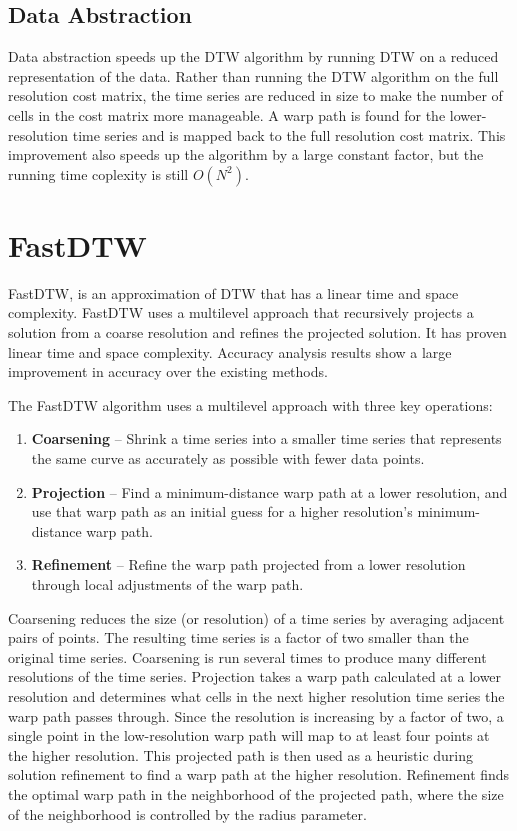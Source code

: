 \subsection{Data Abstraction}

Data abstraction speeds up the DTW algorithm by running DTW on a reduced representation of the data.
Rather than running the DTW algorithm on the full resolution cost matrix, the time series are
reduced in size to make the number of cells in the cost matrix more manageable. A warp path is found
for the lower-resolution time series and is mapped back to the full resolution cost matrix. This
improvement also speeds up the algorithm by a large constant factor, but the running time coplexity
is still $O(N^2)$.

\section{FastDTW}

FastDTW, is an approximation of DTW that has a linear time and space complexity. FastDTW uses a
multilevel approach that recursively projects a solution from a coarse resolution and refines the
projected solution. It has proven linear time and space complexity. Accuracy analysis results show a
large improvement in accuracy over the existing methods. \cite{toward_accurate__dtw}

The FastDTW algorithm uses a multilevel approach with three key operations:
\begin{enumerate}
  \item \textbf{Coarsening} – Shrink a time series into a smaller time series that represents the
  same curve as accurately as possible with fewer data points.
  \item \textbf{Projection} – Find a minimum-distance warp path at a lower resolution, and use that
  warp path as an initial guess for a higher resolution’s minimum-distance warp path.
  \item \textbf{Refinement} – Refine the warp path projected from a lower resolution through local
  adjustments of the warp path.
\end{enumerate}

Coarsening reduces the size (or resolution) of a time series by averaging adjacent pairs of points.
The resulting time series is a factor of two smaller than the original time series. Coarsening is
run several times to produce many different resolutions of the time series. Projection takes a warp
path calculated at a lower resolution and determines what cells in the next higher resolution time
series the warp path passes through. Since the resolution is increasing by a factor of two, a single
point in the low-resolution warp path will map to at least four points at the higher resolution.
This projected path is then used as a heuristic during solution refinement to find a warp path at
the higher resolution. Refinement finds the optimal warp path in the neighborhood of the projected
path, where the size of the neighborhood is controlled by the radius parameter.

